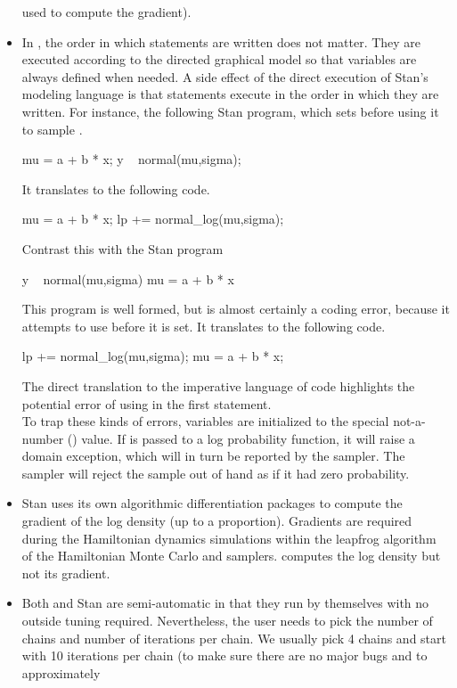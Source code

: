 \begin{itemize}
  used to compute the gradient).
\item In \BUGS, the order in which statements are written does not
  matter.  They are executed according to the directed graphical model
  so that variables are always defined when needed.  A side effect of
  the direct execution of Stan's modeling language is that statements
  execute in the order in which they are written.  For instance, the
  following Stan program, which sets  before using it to
  sample .
%
\begin{stancode}
mu = a + b * x;
y ~ normal(mu,sigma);
\end{stancode}
%
It translates to the following \Cpp code.
%
\begin{stancode}
mu = a + b * x; 
lp += normal_log(mu,sigma);
\end{stancode}
%
Contrast this with the Stan program
%
\begin{stancode}
y ~ normal(mu,sigma)
mu = a + b * x
\end{stancode}
%
This program is well formed, but is almost certainly  
a coding error, because it attempts to use  before 
it is set. It translates to the following \Cpp code.
%
\begin{stancode}
lp += normal_log(mu,sigma);
mu = a + b * x;
\end{stancode}
%
The direct translation to the imperative language of \Cpp code
highlights the potential error of using  in the first
statement.
\\[8pt]
To trap these kinds of errors, variables are initialized to the
special not-a-number () value.  If  is passed to a
log probability function, it will raise a domain exception, which will
in turn be reported by the sampler.  The sampler will reject the
sample out of hand as if it had zero probability.
%
\item Stan uses its own \Cpp algorithmic differentiation packages to
  compute the gradient of the log density (up to a proportion).
  Gradients are required during the Hamiltonian dynamics simulations
  within the leapfrog algorithm of the Hamiltonian Monte Carlo and
  \NUTS samplers.  \BUGS computes the log density but not its
  gradient.
\item Both \BUGS and Stan are semi-automatic in that they run by
  themselves with no outside tuning required. Nevertheless, the user
  needs to pick the number of chains and number of iterations per
  chain.  We usually pick 4 chains and start with 10 iterations per
  chain (to make sure there are no major bugs and to approximately

\end{itemize}

